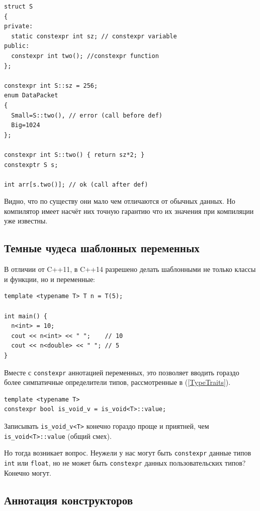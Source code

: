 \documentclass[a4paper,12pt,oneside]{book}
\begin{document}
\begin{lstlisting}
struct S
{
private:
  static constexpr int sz; // constexpr variable
public:
  constexpr int two(); //constexpr function
};

constexpr int S::sz = 256;
enum DataPacket
{
  Small=S::two(), // error (call before def)  
  Big=1024
};

constexpr int S::two() { return sz*2; }
constexptr S s;

int arr[s.two()]; // ok (call after def)
\end{lstlisting}

Видно, что по существу они мало чем отличаются от обычных данных. Но компилятор имеет насчёт них точную гарантию что их значения при компиляции уже известны.

\subsection{Темные чудеса шаблонных переменных}\label{Constexpr:templatevars}

В отличии от C++11, в C++14 разрешено делать шаблонными не только классы и функции, но и переменные:

\begin{lstlisting}
template <typename T> T n = T(5);

int main() {
  n<int> = 10;
  cout << n<int> << " ";    // 10
  cout << n<double> << " "; // 5
}
\end{lstlisting}

Вместе с \lstinline!constexpr! аннотацией переменных, это позволяет вводить гораздо более симпатичные определители типов, рассмотренные в (\ref{TypeTraits}).

\begin{lstlisting}
template <typename T> 
constexpr bool is_void_v = is_void<T>::value;
\end{lstlisting}

Записывать \lstinline!is_void_v<T>! конечно гораздо проще и приятней, чем \lstinline!is_void<T>::value! (общий смех).

Но тогда возникает вопрос. Неужели у нас могут быть \lstinline!constexpr! данные типов \lstinline!int! или \lstinline!float!, но не может быть \lstinline!constexpr! данных пользовательских типов? Конечно могут.

\subsection{Аннотация конструкторов}\label{Constexpr:ctors}
\end{document}
